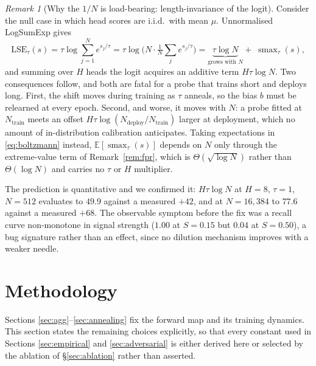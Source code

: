 \documentclass[10pt]{article}
\theoremstyle{plain}
\theoremstyle{definition}
\theoremstyle{remark}
\newtheorem{remark}[theorem]{Remark}
\DeclareMathOperator*{\smax}{smax}
\newcommand{\E}{\mathbb{E}}
\begin{document}
\begin{remark}[Why the $1/N$ is load-bearing: length-invariance of the logit]
\label{rem:normalisation}
Consider the null case in which head scores are i.i.d.\ with mean $\mu$. Unnormalised
LogSumExp gives
\begin{equation}
  \mathrm{LSE}_\tau(s)=\tau\log\sum_{j=1}^{N}e^{s_j/\tau}
  =\tau\log\!\Big(N\cdot\tfrac1N\textstyle\sum_j e^{s_j/\tau}\Big)
  =\underbrace{\tau\log N}_{\text{grows with }N}+\;\smax_\tau(s),
  \label{eq:lseshift}
\end{equation}
and summing over $H$ heads the logit acquires an additive term $H\tau\log N$. Two
consequences follow, and both are fatal for a probe that trains short and deploys long.
First, the shift moves during training as $\tau$ anneals, so the bias $b$ must be relearned
at every epoch. Second, and worse, it moves with $N$: a probe fitted at $N_{\text{train}}$
meets an offset $H\tau\log(N_{\text{deploy}}/N_{\text{train}})$ larger at deployment, which
no amount of in-distribution calibration anticipates. Taking expectations in
\eqref{eq:boltzmann} instead,
$\E[\smax_\tau(s)]$ depends on $N$ only through the extreme-value term of
Remark~\ref{rem:fpr}, which is $\Theta(\sqrt{\log N})$ rather than $\Theta(\log N)$ and
carries no $\tau$ or $H$ multiplier.

The prediction is quantitative and we confirmed it: $H\tau\log N$ at $H{=}8$, $\tau{=}1$,
$N{=}512$ evaluates to $49.9$ against a measured $+42$, and at $N{=}16{,}384$ to $77.6$
against a measured $+68$. The observable symptom before the fix was a recall curve
non-monotone in signal strength ($1.00$ at $S{=}0.15$ but $0.04$ at $S{=}0.50$), a bug
signature rather than an effect, since no dilution mechanism improves with a weaker needle.
\end{remark}

\section{Methodology}
\label{sec:method}
Sections \ref{sec:agg}--\ref{sec:annealing} fix the forward map and its training
dynamics. This section states the remaining choices explicitly, so that every constant
used in Sections \ref{sec:empirical} and \ref{sec:adversarial} is either derived here or
selected by the ablation of \S\ref{sec:ablation} rather than asserted.
\end{document}
